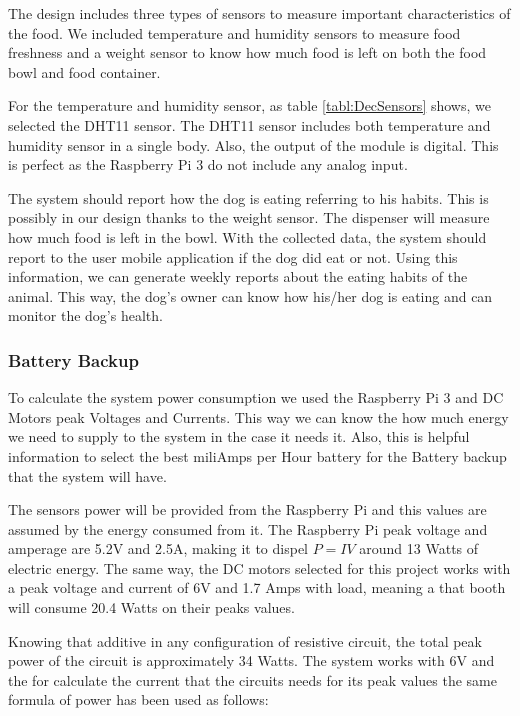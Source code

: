 \documentclass[12pt]{article}
\begin{document}
The design includes three types of sensors to measure important characteristics of the food. We included temperature and humidity sensors to measure food freshness and a weight sensor to know how much food is left on both the food bowl and food container.

For the temperature and humidity sensor, as table \ref{tabl:DecSensors} shows, we selected the DHT11 sensor. The DHT11 sensor includes both temperature and humidity sensor in a single body. Also, the output of the module is digital. This is perfect as the Raspberry Pi 3 do not include any analog input.

The system should report how the dog is eating referring to his habits. This is possibly in our design thanks to the weight sensor. The dispenser will measure how much food is left in the bowl. With the collected data, the system should report to the user mobile application if the dog did eat or not. Using this information, we can generate weekly reports about the eating habits of the animal. This way, the dog's owner can know how his/her dog is eating and can monitor the dog's health.


\subsubsection{Battery Backup}

To calculate the system power consumption we used the Raspberry Pi 3 and DC Motors peak Voltages and Currents. This way we can know the how much energy we need to supply to the system in the case it needs it. Also, this is helpful information to select the best miliAmps per Hour battery for the Battery backup that the system will have.

The sensors power will be provided from the Raspberry Pi and this values are assumed by the energy consumed from it. The Raspberry Pi peak voltage and amperage are 5.2V and 2.5A, making it to dispel \(P = IV\) around 13 Watts of electric energy. The same way, the DC motors selected for this project works with a peak voltage and current of 6V and 1.7 Amps with load, meaning a that booth will consume 20.4 Watts on their peaks values.

Knowing that additive in any configuration of resistive circuit, the total peak power of the circuit is approximately 34 Watts. The system works with 6V and the for calculate the current that the circuits needs for its peak values the same formula of power\cite{AllAboutCircuits} has been used as follows:
\end{document}
